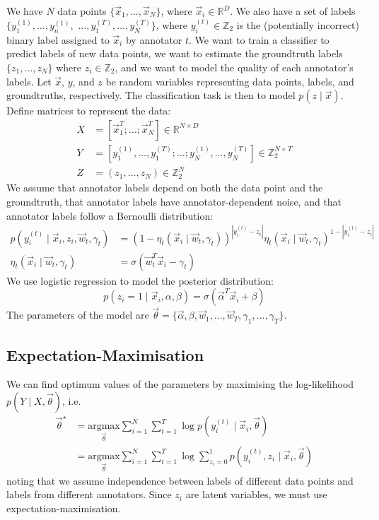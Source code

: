       We have $N$ data points $\{\vec x_1, \dots, \vec x_N\}$, where $\vec x_i \in \mathbb{R}^D$. We also have a set of labels $\{y_1^{(1)}, \dots, y_n^{(1)},$ $\dots, y_1^{(T)}, \dots, y_N^{(T)}\}$, where $y_i^{(t)} \in \mathbb{Z}_2$ is the (potentially incorrect) binary label assigned to $\vec x_i$ by annotator $t$. We want to train a classifier to predict labels of new data points, we want to estimate the groundtruth labels $\{z_1, \dots, z_N\}$ where $z_i \in \mathbb{Z}_2$, and we want to model the quality of each annotator's labels. Let $\vec x$, $y$, and $z$ be random variables representing data points, labels, and groundtruths, respectively. The classification task is then to model $p(z \mid \vec x)$.
      Define matrices to represent the data:
      \begin{align*}
          X &= [\vec x_1^T; \dots; \vec x_N^T] \in \mathbb{R}^{N \times D}\\
          Y &= [y_1^{(1)}, \dots, y_1^{(T)}; \dots; y_N^{(1)}, \dots, y_N^{(T)}] \in \mathbb{Z}_2^{N \times T}\\
          Z &= (z_1, \dots, z_N) \in \mathbb{Z}_2^N
      \end{align*}
      We assume that annotator labels depend on both the data point and the groundtruth, that annotator labels have annotator-dependent noise, and that annotator labels follow a Bernoulli distribution:
      \begin{align*}
          p(y_i^{(t)} \mid \vec x_i, z_i, \vec w_t, \gamma_t) &= (1 - \eta_t(\vec x_i \mid \vec w_t, \gamma_t))^{|y_i^{(t)} - z_i|} \eta_t(\vec x_i \mid \vec w_t, \gamma_t)^{1 - |y_i^{(t)} - z_i|}\\
          \eta_t(\vec x_i \mid \vec w_t, \gamma_t) &= \sigma(\vec w_t^T \vec x_i - \gamma_t)
      \end{align*}
      We use logistic regression to model the posterior distribution:
      \[
          p(z_i = 1 \mid \vec x_i, \alpha, \beta) = \sigma(\vec \alpha^T \vec x_i + \beta)
      \]
      The parameters of the model are $\vec \theta = \{\vec \alpha, \beta, \vec w_1, \dots, \vec w_T, \gamma_1, \dots, \gamma_T\}$.

  \subsection{Expectation-Maximisation}

      We can find optimum values of the parameters by maximising the log-likelihood $p(Y \mid X, \vec \theta)$, i.e.
      \begin{align*}
          \vec \theta^\star &= \underset{\vec \theta}{\mbox{argmax}} \sum_{i = 1}^N \sum_{t = 1}^T \log p(y_i^{(t)} \mid \vec x_i, \vec \theta)\\
              &= \underset{\vec \theta}{\mbox{argmax}} \sum_{i = 1}^N \sum_{t = 1}^T \log \sum_{z_i = 0}^1 p(y_i^{(t)}, z_i \mid \vec x_i, \vec \theta)
      \end{align*}
      noting that we assume independence between labels of different data points and labels from different annotators. Since $z_i$ are latent variables, we must use expectation-maximisation.\\

